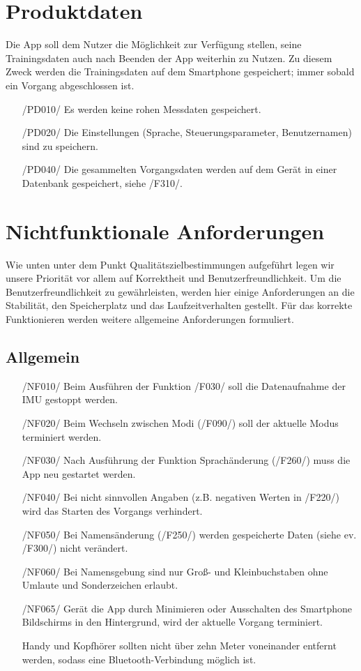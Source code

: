 \documentclass[a4paper,12pt]{article}
\begin{document}
\section{Produktdaten}
Die App soll dem Nutzer die Möglichkeit zur Verfügung stellen, seine Trainingsdaten auch nach Beenden der App weiterhin zu Nutzen. Zu diesem Zweck werden die Trainingsdaten auf dem Smartphone gespeichert; immer sobald ein Vorgang abgeschlossen ist.
\begin{itemize}
	\item[/PD010/] Es werden keine rohen Messdaten gespeichert.
	\item[/PD020/] Die Einstellungen (Sprache, \Gls{Steuerungsparameter}, Benutzernamen) sind zu speichern. 
	\item[/PD040/] Die gesammelten \Gls{Vorgangsdaten} werden auf dem Gerät in einer Datenbank gespeichert, siehe /F310/.
\end{itemize}


\section{Nichtfunktionale Anforderungen}
Wie unten unter dem Punkt Qualitätszielbestimmungen aufgeführt legen wir unsere Priorität vor allem auf Korrektheit und Benutzerfreundlichkeit. Um die Benutzerfreundlichkeit zu gewährleisten, werden hier einige Anforderungen an die Stabilität, den Speicherplatz und das Laufzeitverhalten gestellt. Für das korrekte Funktionieren werden weitere allgemeine Anforderungen formuliert.
\subsection{Allgemein}
\begin{itemize}
  \item[/NF010/] Beim Ausführen der Funktion /F030/ soll die Datenaufnahme der \Gls{IMU} gestoppt werden.
  \item[/NF020/] Beim Wechseln zwischen Modi (/F090/) soll der aktuelle Modus terminiert werden.
  \item[/NF030/] Nach Ausführung der Funktion  Sprachänderung (/F260/) muss die App neu gestartet werden.
  \item[/NF040/] Bei nicht sinnvollen Angaben (z.B. negativen Werten in /F220/) wird das Starten des Vorgangs verhindert.
  \item[/NF050/] Bei Namensänderung (/F250/) werden gespeicherte Daten (siehe ev. /F300/) nicht verändert.
  \item[/NF060/] Bei Namensgebung sind nur Groß- und Kleinbuchstaben ohne Umlaute und Sonderzeichen erlaubt.
  \item[/NF065/] Gerät die App durch Minimieren oder Ausschalten des Smartphone Bildschirms in den Hintergrund, wird der aktuelle Vorgang terminiert.
  \item[] Handy und Kopfhörer sollten nicht über zehn Meter voneinander entfernt werden, sodass eine Bluetooth-Verbindung möglich ist. 
\end{itemize}
\end{document}
